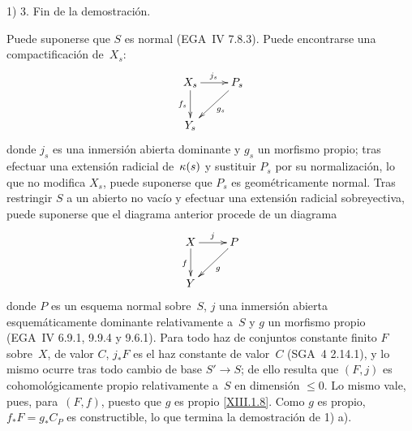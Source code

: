 1) 3. Fin de la demostración.

Puede suponerse que $S$ es normal (EGA~IV 7.8.3). Puede encontrarse una
compactificación de~$X_s$:
$$
\xymatrix{ X_s \ar[r]^{j_s} \ar[d]_{f_s} & P_s \ar[ld]^{g_s} \\ Y_s }
$$
donde $j_s$ es una inmersión abierta dominante y $g_s$ un morfismo
propio; tras efectuar una extensión radicial de~$\kappa(s)$ y sustituir
$P_s$ por su normalización, lo que no modifica $X_s$, puede suponerse
que $P_s$ es geométricamente normal. Tras restringir $S$ a un abierto
no vacío y efectuar una extensión radicial sobreyectiva, puede suponerse
que el diagrama anterior procede de un diagrama
$$
\xymatrix{ X \ar[r]^{j} \ar[d]_{f} & P \ar[ld]^{g} \\ Y }
$$
donde $P$ es un esquema normal sobre~$S$, $j$ una inmersión abierta
esquemáticamente dominante relativamente a~$S$ y $g$ un morfismo propio
(EGA~IV 6.9.1, 9.9.4 y 9.6.1). Para todo haz de conjuntos constante
finito $F$ sobre~$X$, de valor $C$, $j_*F$ es el haz constante de
valor~$C$ (SGA~4 2.14.1), y lo mismo
ocurre tras todo cambio de base $S'\to S$;
de ello resulta que $(F,j)$ es cohomológicamente propio relativamente
a~$S$ en dimensión $\leqslant 0$. Lo mismo vale, pues, para~$(F,f)$,
puesto que $g$ es propio \eqref{XIII.1.8}. Como $g$ es propio,
$f_*F=g_*C_P$ es constructible, lo que termina la demostración de
1)\kern2pt a).
